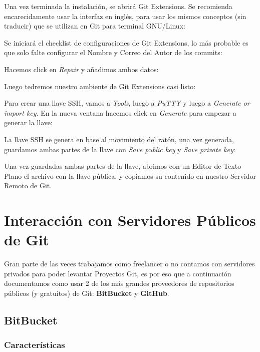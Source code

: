 \documentclass{article}
\begin{document}
Una vez terminada la instalación, se abrirá Git Extensions. Se recomienda encarecidamente usar la interfaz en inglés, para usar los mismos conceptos (sin traducir) que se utilizan en Git para terminal GNU/Linux:

Se iniciará el checklist de configuraciones de Git Extensions, lo más probable es que solo falte configurar el Nombre y Correo del Autor de los commits:

Hacemos click en \textit{Repair} y añadimos ambos datos:

Luego tedremos nuestro ambiente de Git Extensions casi listo:

Para crear una llave SSH, vamos a \textit{Tools}, luego a \textit{PuTTY} y luego a \textit{Generate or import key}. En la nueva ventana hacemos click en \textit{Generate} para empezar a generar la llave:

La llave SSH se genera en base al movimiento del ratón, una vez generada, guardamos ambas partes de la llave con \textit{Save public key} y \textit{Save private key}:

Una vez guardadas ambas partes de la llave, abrimos con un Editor de Texto Plano el archivo con la llave pública, y copiamos su contenido en nuestro Servidor Remoto de Git.

\pagebreak

\section{Interacción con Servidores Públicos de Git}\label{host}

Gran parte de las veces trabajamos como freelancer o no contamos con servidores privados para poder levantar Proyectos Git, es por eso que a continuación documentamos como usar 2 de los más grandes proveedores de repositorios públicos (y gratuitos) de Git: \textbf{BitBucket} y \textbf{GitHub}.

\subsection{BitBucket}

\subsubsection{Características}
\end{document}
